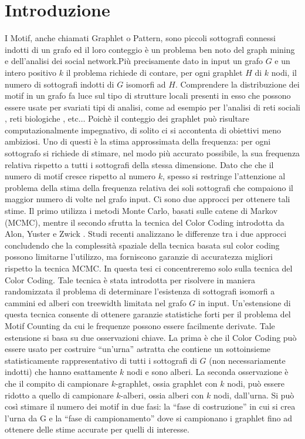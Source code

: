 \chapter{Introduzione}

I Motif, anche chiamati Graphlet o Pattern, sono piccoli sottografi connessi indotti di un grafo ed il loro conteggio \`e un problema ben noto del graph mining e dell'analisi dei social network.Pi\`u precisamente dato in input un grafo $G$ e un intero positivo $k$ il problema richiede di contare,  per ogni graphlet $H$ di $k$ nodi, il numero di sottografi indotti di $G$ isomorfi ad $H$.
Comprendere la distribuzione dei motif in un grafo fa luce sul tipo di strutture locali presenti in esso che possono essere usate per svariati tipi di analisi, come ad esempio per l'analisi di reti sociali \cite{bhuiyan2012guise,zhao2010subgraph,boldi2011layered}, reti biologiche \cite{alon2008biomolecular}, etc$ \dots $
Poich\`e il conteggio dei graphlet pu\`o risultare computazionalmente impegnativo, di solito ci si accontenta di obiettivi meno ambiziosi.
Uno di questi \`e la stima approssimata della frequenza: per ogni sottografo si richiede di stimare, nel modo pi\`u accurato possibile, la sua frequenza relativa rispetto a tutti i sottografi della stessa dimensione.
Dato che che il numero di motif  cresce rispetto al numero $ k $, spesso si restringe l'attenzione al problema della stima della frequenza relativa dei soli sottografi che compaiono il maggior numero di volte nel grafo input.
Ci sono due approcci per ottenere tali stime.
Il primo utilizza i metodi Monte Carlo, basati sulle catene di Markov (MCMC), mentre il secondo sfrutta la tecnica del Color Coding introdotta da Alon, Yuster e Zwick \cite{alon1995color}.
Studi recenti analizzano le differenze tra i due approcci  concludendo che la complessit\`a spaziale della tecnica basata sul color coding possono limitarne l'utilizzo, ma forniscono garanzie di accuratezza migliori rispetto la tecnica MCMC.
In questa tesi ci concentreremo solo sulla tecnica del Color Coding.
Tale tecnica \`e stata introdotta per risolvere in maniera randomizzata il problema di determinare l'esistenza di sottografi isomorfi a cammini ed alberi con treewidth limitata nel grafo $ G $ in input.
Un'estensione di questa tecnica consente di ottenere garanzie statistiche forti per il problema del Motif Counting da cui le frequenze possono essere facilmente derivate.
Tale estensione si basa su due osservazioni chiave.
La prima \`e che il Color Coding pu\`o essere usato per costruire ``un'urna'' astratta che contiene un sottoinsieme statisticamente rappresentativo di tutti i sottografi di $G$ (non necessariamente indotti) che hanno esattamente $ k $ nodi e sono alberi.
La seconda osservazione \`e che il compito di campionare $ k $-graphlet, ossia graphlet con $ k $ nodi, pu\`o essere ridotto a quello di campionare $ k $-alberi, ossia alberi con $ k $ nodi, dall'urna.
Si pu\`o cos\`i stimare il numero dei motif in due fasi: la ``fase di costruzione'' in cui si crea l'urna da G e la ``fase di campionamento'' dove si campionano i graphlet fino ad ottenere delle stime accurate per quelli di interesse.


